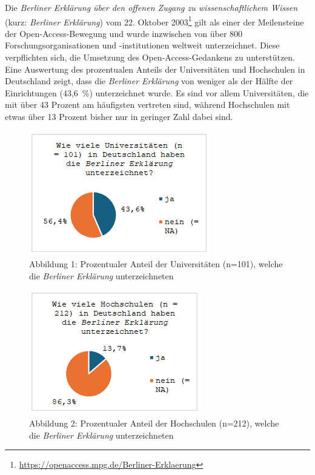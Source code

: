 \documentclass[a4paper,
fontsize=11pt,
oneside,
numbers=noperiodatend,
parskip=half-,
bibliography=totoc,
final
]{scrartcl}
\begin{document}
Die \emph{Berliner Erklärung über den offenen Zugang zu
wissenschaftlichem Wissen} (kurz: \emph{Berliner Erklärung}) vom 22.
Oktober 2003\footnote{\url{https://openaccess.mpg.de/Berliner-Erklaerung}}
gilt als einer der Meilensteine der Open-Access-Bewegung und wurde
inzwischen von über 800 Forschungsorganisationen und -institutionen
weltweit unterzeichnet. Diese verpflichten sich, die Umsetzung des
Open-Access-Gedankens zu unterstützen. Eine Auswertung des prozentualen
Anteils der Universitäten und Hochschulen in Deutschland zeigt, dass die
\emph{Berliner Erklärung} von weniger als der Hälfte der Einrichtungen
(43,6~\%) unterzeichnet wurde. Es sind vor allem Universitäten, die mit
über 43 Prozent am häufigsten vertreten sind, während Hochschulen mit
etwas über 13 Prozent bisher nur in geringer Zahl dabei sind.

\begin{figure}[H]
\centering
\includegraphics[]{img/image002.png}
\caption{Abbildung 1: Prozentualer Anteil der Universitäten (n=101), welche die \emph{Berliner Erklärung} unterzeichneten}
\end{figure}

\begin{figure}[H]
\centering
\includegraphics[]{img/image001.png}
\caption{Abbildung 2: Prozentualer Anteil der Hochschulen (n=212), welche die \emph{Berliner Erklärung} unterzeichneten}
\end{figure}
\end{document}
